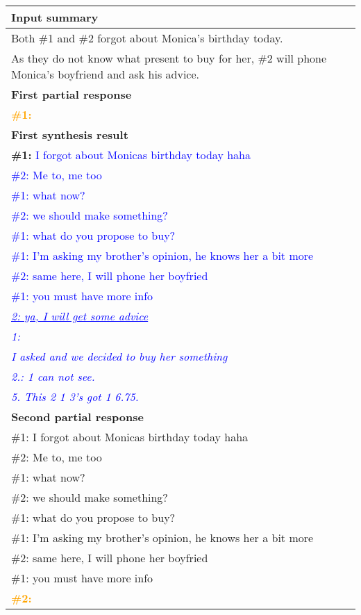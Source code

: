 \begin{table*}[]
\centering
\begin{tabular}{l}
\hline
\textbf{Input summary}\\ \hline
Both \#1 and \#2 forgot about Monica's birthday today. \\ As they do not know what present to buy for her,  \#2 will phone Monica's boyfriend and ask his advice.\\ 
\hline 
\textbf{First partial response}\\ \hline
\textcolor{orange}{\textbf{\#1:}}\\
\hline 
\textbf{First synthesis result}\\ \hline
\textbf{\#1:} 
\textcolor{blue}{I forgot about Monicas birthday today haha} \\
\textcolor{blue}{\#2: Me to, me too}\\
\textcolor{blue}{\#1: what now?}\\
\textcolor{blue}{\#2: we should make something?} \\
\textcolor{blue}{\#1: what do you propose to buy?}\\
\textcolor{blue}{\#1: I'm asking my brother's opinion, he knows her a bit more}\\
\textcolor{blue}{\#2: same here, I will phone her boyfried}\\
\textcolor{blue}{\#1: you must have more info}\\
\textcolor{blue}{\textit{\underline{2: ya, I will get some advice}}}\\
\textcolor{blue}{\textit{1:}}\\
\textcolor{blue}{\textit{I asked and we decided to buy her something}}\\
\textcolor{blue}{\textit{2.: 1 can not see.}}\\
\textcolor{blue}{\textit{5. This 2 1 3’s got 1 6.75.}} \\ 

\hline 
\textbf{Second partial response}\\ \hline
\#1: I forgot about Monicas birthday today haha\\
\#2: Me to, me too\\
\#1: what now?\\
\#2: we should make something? \\
\#1: what do you propose to buy?\\
\#1: I'm asking my brother's opinion, he knows her a bit more\\
\#2: same here, I will phone her boyfried\\
\#1: you must have more info\\
\textcolor{orange}{\textbf{\#2:}}\\


\end{tabular}
\end{table*}
